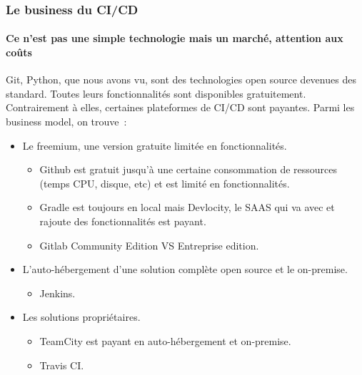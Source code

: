 \documentclass{beamer}
\begin{document}
    \begin{frame}
        \frametitle{Le business du CI/CD}
        \framesubtitle{Ce n'est pas une simple technologie mais un marché, attention aux coûts}
        \transdissolve
        Git, Python, que nous avons vu, sont des technologies open source devenues des standard.
        Toutes leurs fonctionnalités sont disponibles gratuitement.
        Contrairement à elles, certaines plateformes de CI/CD sont payantes.
        \bigbreak
        Parmi les business model, on trouve~:
        \begin{itemize}
            \item Le freemium, une version gratuite limitée en fonctionnalités.
            \begin{itemize}
                \item Github est gratuit jusqu'à une certaine consommation de ressources (temps CPU, disque, etc) et est limité en fonctionnalités.
                \item Gradle est toujours  en local mais Devlocity, le SAAS qui va avec et rajoute des fonctionnalités est payant.
                \item Gitlab Community Edition VS Entreprise edition.
            \end{itemize}
            \item L'auto-hébergement d'une solution complète open source et le on-premise.
            \begin{itemize}
                \item Jenkins.
            \end{itemize}
            \item Les solutions propriétaires.
            \begin{itemize}
                \item TeamCity est payant en auto-hébergement et on-premise.
                \item Travis CI.
            \end{itemize}
        \end{itemize}
    \end{frame}
\end{document}
